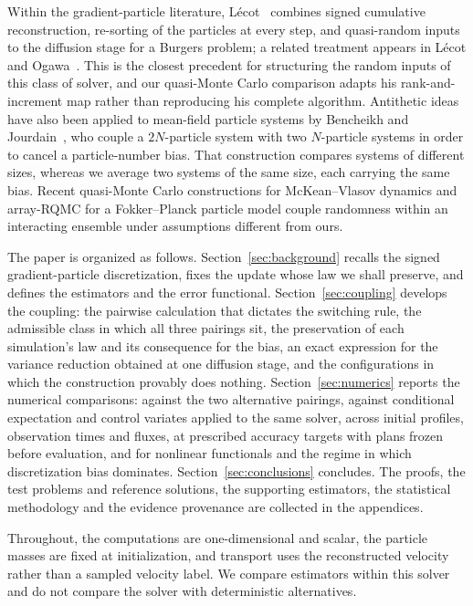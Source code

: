 \documentclass[smallextended,nospthms]{svjour3}
\theoremstyle{plain}
\theoremstyle{definition}
\theoremstyle{remark}
\numberwithin{equation}{section}
\begin{document}
Within the gradient-particle literature, Lécot~\citep{lecot_rims2001} combines
signed cumulative reconstruction, re-sorting of the particles at every step,
and quasi-random inputs to the diffusion stage for a Burgers problem; a related
treatment appears in Lécot and Ogawa~\citep{lecot2002}. This is the closest
precedent for structuring the random inputs of this class of solver, and our
quasi-Monte Carlo comparison adapts his rank-and-increment map rather than
reproducing his complete algorithm. Antithetic ideas have also been applied to
mean-field particle systems by Bencheikh and
Jourdain~\citep{bencheikhjourdain2019}, who couple a $2N$-particle system with
two $N$-particle systems in order to cancel a particle-number bias. That
construction compares systems of different sizes, whereas we average two
systems of the same size, each carrying the same bias. Recent quasi-Monte Carlo
constructions for McKean--Vlasov dynamics \citep{benrached2024} and array-RQMC
for a Fokker--Planck particle model \citep{netterdon2026} couple randomness
within an interacting ensemble under assumptions different from ours.

The paper is organized as follows. Section~\ref{sec:background} recalls the
signed gradient-particle discretization, fixes the update whose law we shall
preserve, and defines the estimators and the error functional.
Section~\ref{sec:coupling} develops the coupling: the pairwise calculation that
dictates the switching rule, the admissible class in which all three pairings
sit, the preservation of each simulation's law and its consequence for the
bias, an exact expression for the variance reduction obtained at one diffusion
stage, and the configurations in which the construction provably does nothing.
Section~\ref{sec:numerics} reports the numerical comparisons: against the two
alternative pairings, against conditional expectation and control variates
applied to the same solver, across initial profiles, observation times and
fluxes, at prescribed accuracy targets with plans frozen before evaluation, and
for nonlinear functionals and the regime in which discretization bias dominates.
Section~\ref{sec:conclusions} concludes. The proofs, the test problems and
reference solutions, the supporting estimators, the statistical methodology and
the evidence provenance are collected in the appendices.

Throughout, the computations are one-dimensional and scalar, the particle
masses are fixed at initialization, and transport uses the reconstructed
velocity rather than a sampled velocity label. We compare estimators within
this solver and do not compare the solver with deterministic alternatives.
\end{document}
